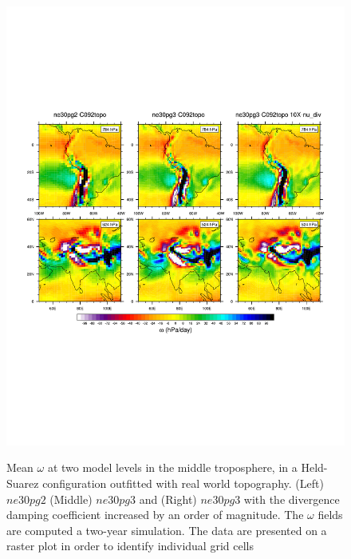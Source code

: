 \documentclass{agujournal}
\begin{document}
\begin{figure}[t]
\begin{center}
\noindent\includegraphics[width=30pc,angle=0]{figs/fhstopo_ne30pg2-v-ne30pg3-v-10Xnudiv.pdf}\\
\end{center}
\caption{Mean $\omega$ at two model levels in the middle troposphere, in a Held-Suarez configuration outfitted with real world topography. (Left) $ne30pg2$ (Middle) $ne30pg3$ and (Right) $ne30pg3$ with the divergence damping coefficient increased by an order of magnitude. The $\omega$ fields are computed a two-year simulation. The data are presented on a raster plot in order to identify individual grid cells}
\label{fig:fhs-contours}
\end{figure}
\end{document}
